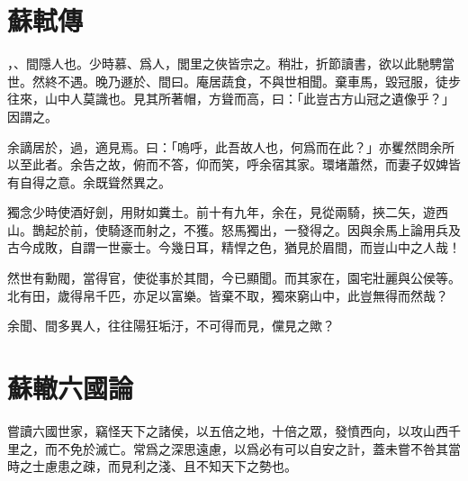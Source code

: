 \section[方山子傳\quad{\small 蘇軾}]{{\normalsize 蘇軾}\quad {}傳}
，、間隱人也。少時慕、爲人，閭里之俠皆宗之。稍壯，折節讀書，欲以此馳騁當世。然終不遇。晚乃遯於、間曰。庵居蔬食，不與世相聞。棄車馬，毀冠服，徒步往來，山中人莫識也。見其所著帽，方聳而高，曰：「此豈古方山冠之遺像乎？」因謂之。

余謫居於，過，適見焉。曰：「嗚呼，此吾故人也，何爲而在此？」亦矍然問余所以至此者。余告之故，俯而不答，仰而笑，呼余宿其家。環堵蕭然，而妻子奴婢皆有自得之意。余既聳然異之。

獨念少時使酒好劍，用財如糞土。前十{有}九年，余在，見從兩騎，挾二矢，遊西山。鵲起於前，使騎逐而射之，不獲。怒馬獨出，一發得之。因與余馬上論用兵及古今成敗，自謂一{世}豪士。今幾日耳，精悍之色，猶見於眉間，而豈山中之人哉！%

然世有勳閥，當得官，使從事於其間，今已顯聞。而其家在，園宅壯麗與公侯等。北有田，歲得帛千匹，亦足以富樂。皆棄不取，獨來窮山中，此豈無得而然哉？

余聞、間多異人，往往{陽}狂垢汙，不可得而見，儻見之歟？%

\theendnotes

\section[六國論\quad{\small 蘇轍}]{{\normalsize 蘇轍}\quad 六國論}
嘗讀六國世家，竊怪天下之諸侯，以五倍之地，十倍之眾，發憤西向，以攻山西千里之，而不免於滅亡。常爲之深思遠慮，以爲必有可以自安之計，蓋未嘗不咎其當時之士慮患之疎，而見利之淺、且不知天下之勢也。

